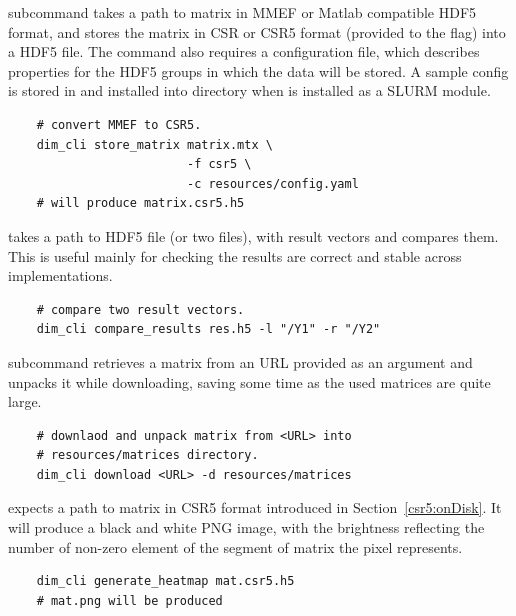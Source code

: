 \documentclass[thesis=M,english]{FITthesis}[2019/12/23]
\begin{document}
 subcommand takes a path to matrix in MMEF or Matlab compatible HDF5 format, and stores
the matrix in CSR or CSR5 format (provided to the  flag) into a HDF5 file. The command also
requires a configuration file, which describes properties for the HDF5 groups in which the data will be
stored. A sample config is stored in  and installed into  directory
when  is installed as a SLURM module.

\begin{verbatim}
    # convert MMEF to CSR5.
    dim_cli store_matrix matrix.mtx \
                         -f csr5 \
                         -c resources/config.yaml
    # will produce matrix.csr5.h5
\end{verbatim}

 takes a path to HDF5 file (or two files), with result vectors and compares them.
This is useful mainly for checking the results are correct and stable across implementations.

\begin{verbatim}
    # compare two result vectors.
    dim_cli compare_results res.h5 -l "/Y1" -r "/Y2"
\end{verbatim}

 subcommand retrieves a matrix from an URL provided as an argument and unpacks it while
downloading, saving some time as the used matrices are quite large.

\begin{verbatim}
    # downlaod and unpack matrix from <URL> into 
    # resources/matrices directory.
    dim_cli download <URL> -d resources/matrices
\end{verbatim}

 expects a path to matrix in CSR5 format introduced in Section~\ref{csr5:onDisk}.
It will produce a black and white PNG image, with the brightness reflecting the number of non-zero element
of the segment of matrix the pixel represents.

\begin{verbatim}
    dim_cli generate_heatmap mat.csr5.h5
    # mat.png will be produced
\end{verbatim}
\end{document}
